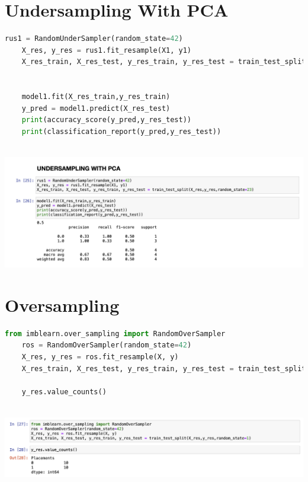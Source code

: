 \documentclass{article}
\begin{document}
\section{Undersampling With PCA}
\begin{lstlisting}[language=Python]
	rus1 = RandomUnderSampler(random_state=42)
	X_res, y_res = rus1.fit_resample(X1, y1)
	X_res_train, X_res_test, y_res_train, y_res_test = train_test_split(X_res,y_res,random_state=23)
	
	
	model1.fit(X_res_train,y_res_train)
	y_pred = model1.predict(X_res_test)
	print(accuracy_score(y_pred,y_res_test))
	print(classification_report(y_pred,y_res_test))
	
\end{lstlisting}

\includegraphics[scale=0.45]{images/11.png}
\section{Oversampling}
\begin{lstlisting}[language=Python]
	from imblearn.over_sampling import RandomOverSampler
	ros = RandomOverSampler(random_state=42)
	X_res, y_res = ros.fit_resample(X, y)
	X_res_train, X_res_test, y_res_train, y_res_test = train_test_split(X_res,y_res,random_state=1)
	
	y_res.value_counts()
	
\end{lstlisting}
\includegraphics[scale=0.45]{images/12.png}
\end{document}
